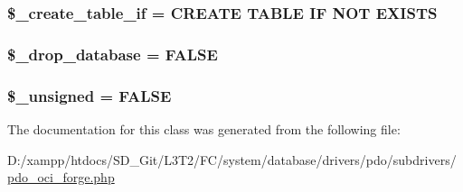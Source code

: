 \subsubsection[{\$\+\_\+create\+\_\+table\+\_\+if}]{\setlength{\rightskip}{0pt plus 5cm}\$\+\_\+create\+\_\+table\+\_\+if = \textquotesingle{}C\+R\+E\+A\+T\+E T\+A\+B\+L\+E I\+F N\+O\+T E\+X\+I\+S\+T\+S\textquotesingle{}\hspace{0.3cm}{\ttfamily [protected]}}\label{class_c_i___d_b__pdo__oci__forge_a2f6484fcb8d1dc3eef67a637227cd583}
\hypertarget{class_c_i___d_b__pdo__oci__forge_a8305b12fc17f6f87778260ebdff287b4}{}
\subsubsection[{\$\+\_\+drop\+\_\+database}]{\setlength{\rightskip}{0pt plus 5cm}\$\+\_\+drop\+\_\+database = F\+A\+L\+S\+E\hspace{0.3cm}{\ttfamily [protected]}}\label{class_c_i___d_b__pdo__oci__forge_a8305b12fc17f6f87778260ebdff287b4}
\hypertarget{class_c_i___d_b__pdo__oci__forge_aae977ae6d61fa183f0b25422b6ddc31c}{}
\subsubsection[{\$\+\_\+unsigned}]{\setlength{\rightskip}{0pt plus 5cm}\$\+\_\+unsigned = F\+A\+L\+S\+E\hspace{0.3cm}{\ttfamily [protected]}}\label{class_c_i___d_b__pdo__oci__forge_aae977ae6d61fa183f0b25422b6ddc31c}


The documentation for this class was generated from the following file\+:\begin{DoxyCompactItemize}
\item 
D\+:/xampp/htdocs/\+S\+D\+\_\+\+Git/\+L3\+T2/\+F\+C/system/database/drivers/pdo/subdrivers/\hyperlink{pdo__oci__forge_8php}{pdo\+\_\+oci\+\_\+forge.\+php}\end{DoxyCompactItemize}
